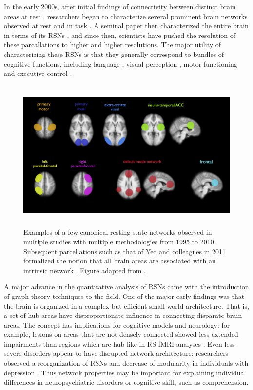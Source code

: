 In the early 2000s, after initial findings of connectivity between distinct brain areas at rest \citep{Biswal1995}, researchers began to characterize several prominent brain networks observed at rest and in task \citep{VandenHeuvel2010}. A seminal paper then characterized the entire brain in terms of its RSNs \citep{Yeo2011}, and since then, scientists have pushed the resolution of these parcallations to higher and higher resolutions. The major utility of characterizing these RSNs is that they generally correspond to bundles of cognitive functions, including language \citep{Cordes2000, Hampson2002}, visual perception \citep{Simmons2012}, motor functioning \citep{Biswal1995} and executive control \citep{Seeley2007}. 

\begin{figure}[t]
    \centering
    \includegraphics[height=3in]{images/ch1-ica.png}
    \caption[Examples of canonical resting-state networks]{Examples of a few canonical resting-state networks observed in multiple studies with multiple methodologies from 1995 to 2010 \citep{Biswal1995, Beckmann2005, DeLuca2006,VandenHeuvel2009}. Subsequent parcellations such as that of Yeo and colleagues in 2011 formalized the notion that all brain areas are associated with an intrinsic network \citep{Yeo2011}. Figure adapted from \citep{VandenHeuvel2010}.}
    \label{fig:ch1-ica}
\end{figure}

A major advance in the quantitative analysis of RSNs came with the introduction of graph theory techniques to the field. One of the major early findings was that the brain is organized in a complex but efficient small-world architecture. That is, a set of hub areas have disproportionate influence in connecting disparate brain areas. The concept has implications for cognitive models and neurology: for example, lesions on areas that are not densely connected showed less extended impairments than regions which are hub-like in RS-fMRI analyses \citep{Warren2014}. Even less severe disorders appear to have disrupted network architecture: researchers observed a reorganization of RSNs and decrease of modularity in individuals with depression \citep{Lord2012}. Thus network properties may be important for explaining individual differences in neuropsychiatric disorders or cognitive skill, such as comprehension.

